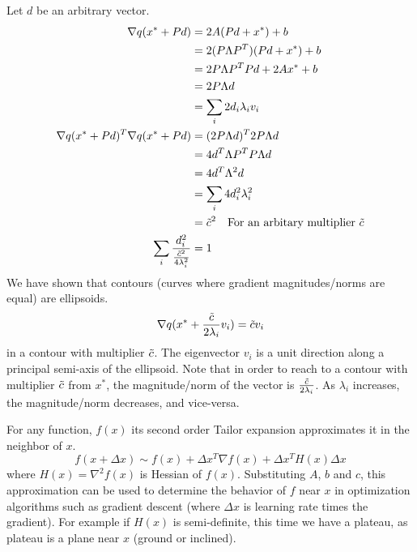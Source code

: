 \documentclass{article}
\numberwithin{equation}{subsection}
\begin{document}
Let $d$ be an arbitrary vector.
\begin{align}
    \nabla q(x^* + Pd) &= 2A(Pd + x^*)+b\\
    &= 2(P\Lambda P^T)(Pd + x^*)+b\\
    &= 2P\Lambda P^TPd + 2Ax^*+b\\
    &= 2P\Lambda d\\
    &= \sum_i 2d_i\lambda_i v_i\\
    \nabla q(x^*+Pd)^T \nabla q(x^*+Pd) &= (2P\Lambda d)^T2P\Lambda d\\
    &= 4d^T\Lambda P^TP\Lambda d\\
    &= 4d^T\Lambda^2 d\\
    &= \sum_i 4d_i^2  \lambda_i^2\\
    &= \Tilde{c}^2 \quad \text{For an arbitary multiplier $\Tilde{c}$}\\
    \sum_i \frac{d_i^2}{\frac{\Tilde{c}^2}{4\lambda_i^2}} &= 1
\end{align}
We have shown that contours (curves where gradient magnitudes/norms are equal) are ellipsoids.
\begin{equation}
    \nabla q(x^* + \frac{\Tilde{c}}{2\lambda_i}v_i) = \Tilde{c}v_i
\end{equation}
in a contour with multiplier $\Tilde{c}$. The eigenvector $v_i$ is a unit direction along a principal semi-axis of the ellipsoid. Note that in order to reach to a contour with multiplier $\Tilde{c}$ from $x^*$, the magnitude/norm of the vector is $\frac{\Tilde{c}}{2\lambda_i}$. As $\lambda_i$ increases, the magnitude/norm decreases, and vice-versa.

For any function, $f(x)$ its second order Tailor expansion approximates it in the neighbor of $x$.
\begin{equation}
    f(x+\Delta x) \sim f(x)+\Delta x^T\nabla f(x)+\Delta x^TH(x)\Delta x
\end{equation}
where $H(x) = \nabla^2f(x)$ is Hessian of $f(x)$. Substituting $A$, $b$ and $c$, this approximation can be used to determine the behavior of $f$ near $x$ in optimization algorithms such as gradient descent (where $\Delta x$ is learning rate times the gradient). For example if $H(x)$ is semi-definite, this time we have a plateau, as plateau is a plane near $x$ (ground or inclined).
\end{document}
